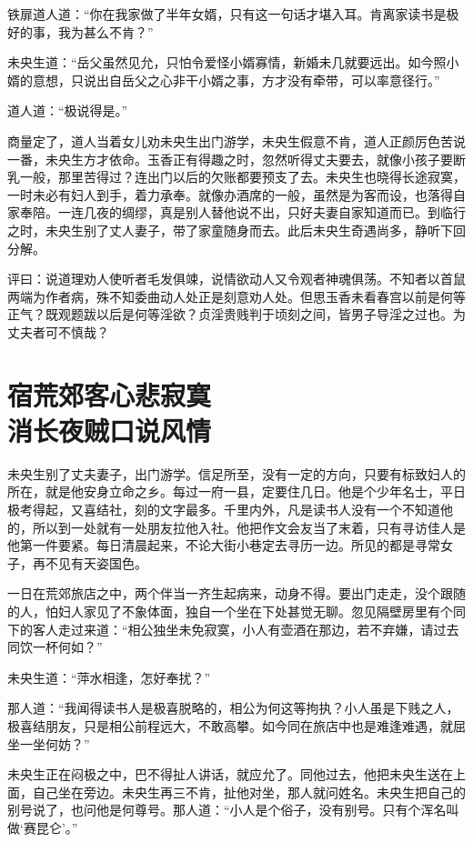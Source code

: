 \documentclass[a4paper,12pt,UTF8,twoside]{ctexbook}
\begin{document}
铁扉道人道：“你在我家做了半年女婿，只有这一句话才堪入耳。肯离家读书是极好的事，我为甚么不肯？”

未央生道：“岳父虽然见允，只怕令爱怪小婿寡情，新婚未几就要远出。如今照小婿的意想，只说出自岳父之心非干小婿之事，方才没有牵带，可以率意径行。”

道人道：“极说得是。”

商量定了，道人当着女儿劝未央生出门游学，未央生假意不肯，道人正颜厉色苦说一番，未央生方才依命。玉香正有得趣之时，忽然听得丈夫要去，就像小孩子要断乳一般，那里苦得过？连出门以后的欠账都要预支了去。未央生也晓得长途寂寞，一时未必有妇人到手，着力承奉。就像办酒席的一般，虽然是为客而设，也落得自家奉陪。一连几夜的绸缪，真是别人替他说不出，只好夫妻自家知道而已。到临行之时，未央生别了丈人妻子，带了家童随身而去。此后未央生奇遇尚多，静听下回分解。

评曰：说道理劝人使听者毛发俱竦，说情欲动人又令观者神魂俱荡。不知者以首鼠两端为作者病，殊不知委曲动人处正是刻意劝人处。但思玉香未看春宫以前是何等正气？既观题跋以后是何等淫欲？贞淫贵贱判于顷刻之间，皆男子导淫之过也。为丈夫者可不慎哉？

\chapter[宿荒郊客心悲寂寞\ 消长夜贼口说风情]{宿荒郊客心悲寂寞\\消长夜贼口说风情}

未央生别了丈夫妻子，出门游学。信足所至，没有一定的方向，只要有标致妇人的所在，就是他安身立命之乡。每过一府一县，定要住几日。他是个少年名士，平日极考得起，又喜结社，刻的文字最多。千里内外，凡是读书人没有一个不知道他的，所以到一处就有一处朋友拉他入社。他把作文会友当了末着，只有寻访佳人是他第一件要紧。每日清晨起来，不论大街小巷定去寻历一边。所见的都是寻常女子，再不见有天姿国色。

一日在荒郊旅店之中，两个伴当一齐生起病来，动身不得。要出门走走，没个跟随的人，怕妇人家见了不象体面，独自一个坐在下处甚觉无聊。忽见隔壁房里有个同下的客人走过来道：“相公独坐未免寂寞，小人有壶酒在那边，若不弃嫌，请过去同饮一杯何如？”

未央生道：“萍水相逢，怎好奉扰？”

那人道：“我闻得读书人是极喜脱略的，相公为何这等拘执？小人虽是下贱之人，极喜结朋友，只是相公前程远大，不敢高攀。如今同在旅店中也是难逢难遇，就屈坐一坐何妨？”

未央生正在闷极之中，巴不得扯人讲话，就应允了。同他过去，他把未央生送在上面，自己坐在旁边。未央生再三不肯，扯他对坐，那人就问姓名。未央生把自己的别号说了，也问他是何尊号。那人道：“小人是个俗子，没有别号。只有个浑名叫做‘赛昆仑’。”
\end{document}
